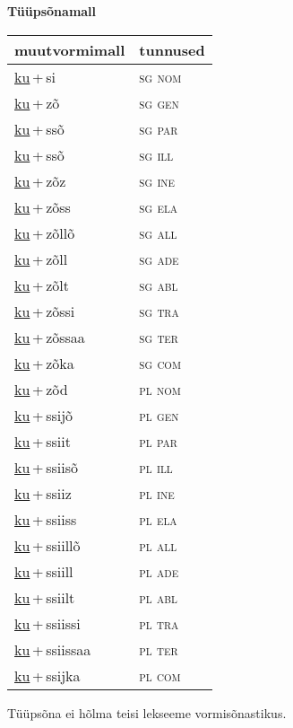 
\vspace{1.8em}
\begin{minipage}{\textwidth}
\textbf{Tüüpsõnamall \,}\\

\begin{sideways}
\begin{tabular}{l l}
muutvormimall & tunnused \\
\hline
\underline{ku}\,+\,si & \textsc{ sg nom } \\
\underline{ku}\,+\,zõ & \textsc{ sg gen } \\
\underline{ku}\,+\,ssõ & \textsc{ sg par } \\
\underline{ku}\,+\,ssõ & \textsc{ sg ill } \\
\underline{ku}\,+\,zõz & \textsc{ sg ine } \\
\underline{ku}\,+\,zõss & \textsc{ sg ela } \\
\underline{ku}\,+\,zõllõ & \textsc{ sg all } \\
\underline{ku}\,+\,zõll & \textsc{ sg ade } \\
\underline{ku}\,+\,zõlt & \textsc{ sg abl } \\
\underline{ku}\,+\,zõssi & \textsc{ sg tra } \\
\underline{ku}\,+\,zõssaa & \textsc{ sg ter } \\
\underline{ku}\,+\,zõka & \textsc{ sg com } \\
\underline{ku}\,+\,zõd & \textsc{ pl nom } \\
\underline{ku}\,+\,ssijõ & \textsc{ pl gen } \\
\underline{ku}\,+\,ssiit & \textsc{ pl par } \\
\underline{ku}\,+\,ssiisõ & \textsc{ pl ill } \\
\underline{ku}\,+\,ssiiz & \textsc{ pl ine } \\
\underline{ku}\,+\,ssiiss & \textsc{ pl ela } \\
\underline{ku}\,+\,ssiillõ & \textsc{ pl all } \\
\underline{ku}\,+\,ssiill & \textsc{ pl ade } \\
\underline{ku}\,+\,ssiilt & \textsc{ pl abl } \\
\underline{ku}\,+\,ssiissi & \textsc{ pl tra } \\
\underline{ku}\,+\,ssiissaa & \textsc{ pl ter } \\
\underline{ku}\,+\,ssijka & \textsc{ pl com } \\
\end{tabular}
\end{sideways}
\label{tab:tüüpsõnamall-kusi}

\end{minipage}

 
\vspace{1em}
\noindent Tüüpsõna ei hõlma teisi lekseeme vormi\-sõnastikus.

